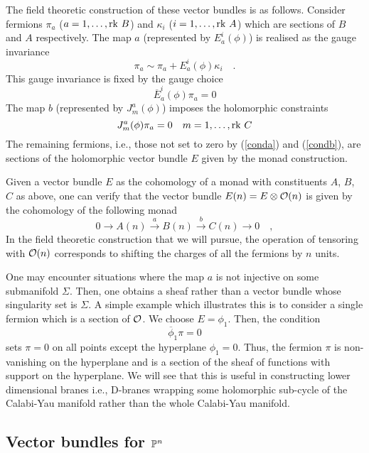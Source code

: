 \documentclass[a4paper,12pt]{article}
\begin{document}
The field theoretic construction of these vector bundles is as
follows\cite{wittenphases}.
Consider fermions $\pi_a$ ($a=1,\ldots,{\rm rk}\ B$) and $\kappa_i$
($i=1,\ldots,{\rm rk}\ A$)
which are sections of $B$ and $A$ respectively.  The map $a$ 
(represented by  $E_a^i(\phi)$) is realised as the gauge invariance
$$
\pi_a \sim \pi_a + E^i_a(\phi) \kappa_i \quad.
$$
This gauge invariance is fixed by the gauge choice
\begin{equation}
\overline{E}_a^i(\phi) \pi_a =0
\label{conda}
\end{equation}
The map $b$ (represented by $J^a_m(\phi)$) imposes the holomorphic
constraints
\begin{equation}
J^a_m(\phi)\pi_a =0\quad m=1,\ldots,{\rm rk}\ C
\label{condb}
\end{equation}
The remaining fermions, i.e., those not set to zero by (\ref{conda}) and
(\ref{condb}), are sections of the holomorphic vector bundle $E$ given
by the monad construction.  

Given a vector bundle $E$ as the cohomology of a monad with constituents
$A$, $B$, $C$ as above, one can verify that the vector bundle
$E(n)=E\otimes {\cal O}(n)$ is given by the cohomology of the following
monad
\begin{equation}
0\rightarrow A(n) \stackrel{a}{\rightarrow} B(n) \stackrel{b}{\rightarrow}
C(n) \rightarrow 0\quad,
\end{equation}
In the field theoretic construction that we will pursue, the operation
of tensoring with ${\cal O}(n)$ corresponds to shifting the charges of
all the fermions by $n$ units.

One may encounter situations where the map $a$ is not injective on
some submanifold $\Sigma$. Then, one obtains a sheaf rather than a vector bundle
whose singularity set is $\Sigma$. A simple example which illustrates
this is to consider a single fermion which is a section of ${\cal O}$.
We choose $E=\phi_1$. Then, the condition
$$
\overline{\phi}_1 \pi =0
$$
sets $\pi=0$ on all points except the hyperplane $\phi_1=0$. Thus, the
fermion $\pi$ is non-vanishing on the hyperplane and is a section
of the sheaf of functions with support on the hyperplane. We will see
that this is useful in constructing lower dimensional branes i.e.,
D-branes wrapping some holomorphic sub-cycle of the Calabi-Yau manifold
rather than the whole Calabi-Yau manifold.





\subsection{Vector bundles for $\mathbb P^n$}
\label{secvbpn}
\end{document}
